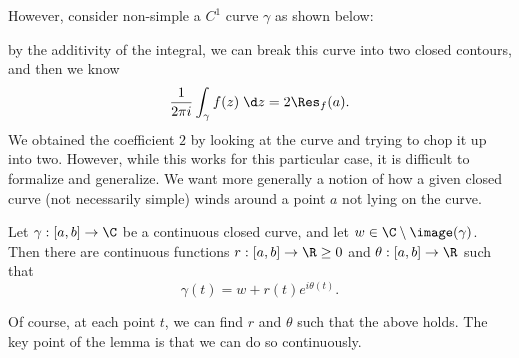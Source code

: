 \documentclass[a4paper]{article}
\begin{document}
However, consider non-simple a $C^1$ curve $\gamma$ as shown below:
\begin{center}
\end{center}
by the additivity of the integral, we can break this curve into two closed contours, and then we know
\[
  \frac{1}{2\pi i} \int_\gamma f(z)\;\d z = 2 \Res_f(a).
\]
We obtained the coefficient $2$ by looking at the curve and trying to chop it up into two. However, while this works for this particular case, it is difficult to formalize and generalize. We want more generally a notion of how a given closed curve (not necessarily simple) winds around a point $a$ not lying on the curve.

\begin{lemma}
  Let $\gamma: [a, b] \to \C$ be a continuous closed curve, and let $w \in \C \setminus \image (\gamma)$. Then there are continuous functions $r: [a, b] \to \R \geq 0$ and $\theta: [a, b] \to \R$ such that
  \[
    \gamma(t) = w + r(t) e^{i\theta(t)}.
  \]
\end{lemma}
Of course, at each point $t$, we can find $r$ and $\theta$ such that the above holds. The key point of the lemma is that we can do so continuously.
\end{document}
